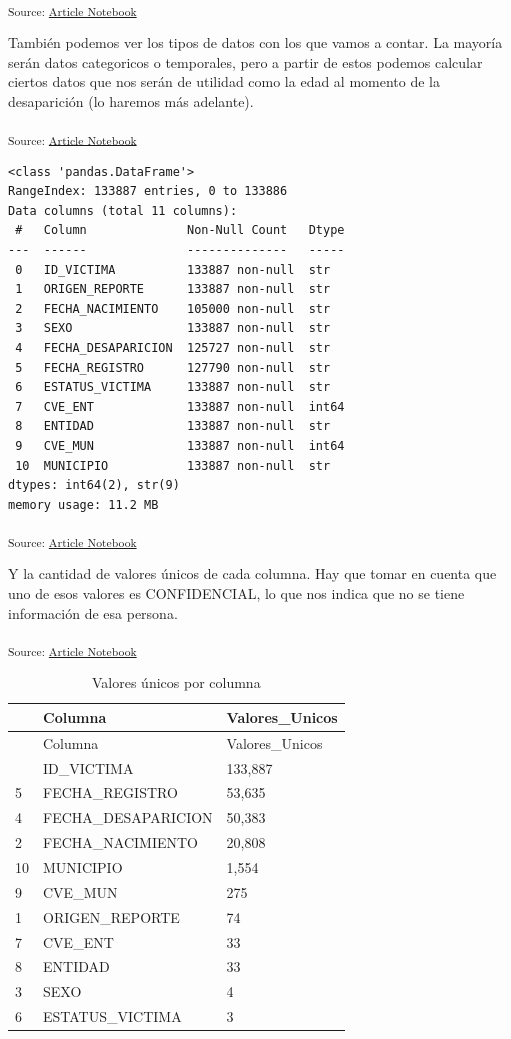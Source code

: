 \documentclass[
]{agujournal2019}
\begin{document}
\textsubscript{Source:
\href{https://Rou-uu.github.io/pruebaQuarto/index.qmd.html}{Article
Notebook}}

También podemos ver los tipos de datos con los que vamos a contar. La
mayoría serán datos categoricos o temporales, pero a partir de estos
podemos calcular ciertos datos que nos serán de utilidad como la edad al
momento de la desaparición (lo haremos más adelante).

\textsubscript{Source:
\href{https://Rou-uu.github.io/pruebaQuarto/index.qmd.html}{Article
Notebook}}

\begin{verbatim}
<class 'pandas.DataFrame'>
RangeIndex: 133887 entries, 0 to 133886
Data columns (total 11 columns):
 #   Column              Non-Null Count   Dtype
---  ------              --------------   -----
 0   ID_VICTIMA          133887 non-null  str  
 1   ORIGEN_REPORTE      133887 non-null  str  
 2   FECHA_NACIMIENTO    105000 non-null  str  
 3   SEXO                133887 non-null  str  
 4   FECHA_DESAPARICION  125727 non-null  str  
 5   FECHA_REGISTRO      127790 non-null  str  
 6   ESTATUS_VICTIMA     133887 non-null  str  
 7   CVE_ENT             133887 non-null  int64
 8   ENTIDAD             133887 non-null  str  
 9   CVE_MUN             133887 non-null  int64
 10  MUNICIPIO           133887 non-null  str  
dtypes: int64(2), str(9)
memory usage: 11.2 MB
\end{verbatim}

\textsubscript{Source:
\href{https://Rou-uu.github.io/pruebaQuarto/index.qmd.html}{Article
Notebook}}

Y la cantidad de valores únicos de cada columna. Hay que tomar en cuenta
que uno de esos valores es CONFIDENCIAL, lo que nos indica que no se
tiene información de esa persona.

\textsubscript{Source:
\href{https://Rou-uu.github.io/pruebaQuarto/index.qmd.html}{Article
Notebook}}

\begin{longtable}[]{@{}lll@{}}
\caption{Valores únicos por columna}\label{T_16ec0}\tabularnewline
\toprule\noalign{}
~ & Columna & Valores\_Unicos \\
\midrule\noalign{}
\endfirsthead
\toprule\noalign{}
~ & Columna & Valores\_Unicos \\
\midrule\noalign{}
\endhead
\bottomrule\noalign{}
\endlastfoot
0 & ID\_VICTIMA & 133,887 \\
5 & FECHA\_REGISTRO & 53,635 \\
4 & FECHA\_DESAPARICION & 50,383 \\
2 & FECHA\_NACIMIENTO & 20,808 \\
10 & MUNICIPIO & 1,554 \\
9 & CVE\_MUN & 275 \\
1 & ORIGEN\_REPORTE & 74 \\
7 & CVE\_ENT & 33 \\
8 & ENTIDAD & 33 \\
3 & SEXO & 4 \\
6 & ESTATUS\_VICTIMA & 3 \\
\end{longtable}
\end{document}

